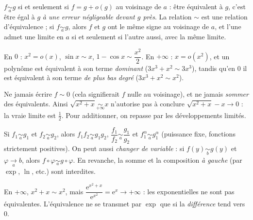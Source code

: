 \begin{propriete}
$f\underset{a}{\sim}g$ si et seulement si $f=g+o(g)$ au voisinage de $a$ :
être équivalent à $g$, c'est être égal à $g$ \emph{à une erreur négligeable
devant $g$ près}. La relation $\sim$ est une relation d'équivalence ; si
$f\underset{a}{\sim}g$, alors $f$ et $g$ ont le même signe au voisinage de
$a$, et l'une admet une limite en $a$ si et seulement si l'autre aussi, avec
la même limite.
\end{propriete}

\begin{exemple}
En $0$ : $x^{2}=o(x)$, $\sin x\sim x$, $1-\cos x\sim\dfrac{x^{2}}{2}$.
En $+\infty$ : $x=o(x^{2})$, et un polynôme est équivalent à son terme
\emph{dominant} ($3x^{3}+x^{2}\sim3x^{3}$), tandis qu'en $0$ il est
équivalent à son terme \emph{de plus bas degré} ($3x^{3}+x^{2}\sim x^{2}$).
\end{exemple}

\begin{attention}
Ne jamais écrire $f\sim0$ (cela signifierait $f$ nulle au voisinage), et ne
jamais \emph{sommer} des équivalents. Ainsi
$\sqrt{x^{2}+x}\underset{+\infty}{\sim}x$ n'autorise pas à conclure
$\sqrt{x^{2}+x}-x\to0$ : la vraie limite est $\tfrac12$. Pour additionner,
on repasse par les développements limités.
\end{attention}


\begin{propriete}
Si $f_1\underset{a}{\sim}g_1$ et $f_2\underset{a}{\sim}g_2$, alors
$f_1f_2\underset{a}{\sim}g_1g_2$, $\dfrac{f_1}{f_2}\underset{a}{\sim}\dfrac{g_1}{g_2}$
et $f_1^{\alpha}\underset{a}{\sim}g_1^{\alpha}$ (puissance fixe, fonctions
strictement positives). On peut aussi \emph{changer de variable} : si
$f(y)\underset{b}{\sim}g(y)$ et $\varphi\xrightarrow[a]{}b$, alors
$f\circ\varphi\underset{a}{\sim}g\circ\varphi$. En revanche, la somme et la
composition \emph{à gauche} (par $\exp$, $\ln$, etc.) sont interdites.
\end{propriete}

\begin{exemple}
En $+\infty$, $x^{2}+x\sim x^{2}$, mais
$\dfrac{\mathrm{e}^{x^{2}+x}}{\mathrm{e}^{x^{2}}}=\mathrm{e}^{x}\to+\infty$ :
les exponentielles ne sont pas équivalentes. L'équivalence ne se transmet
par $\exp$ que si la \emph{différence} tend vers $0$.
\end{exemple}

